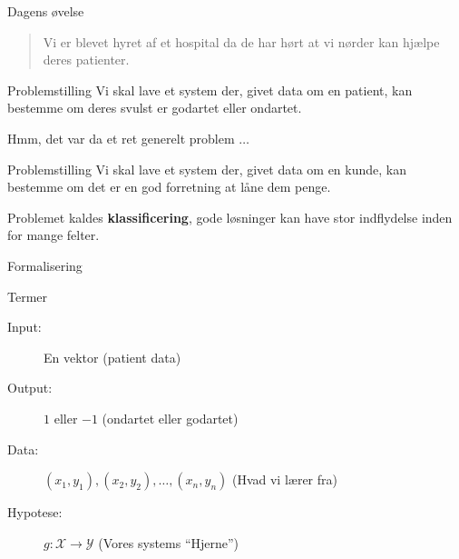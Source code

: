 \documentclass[12pt,t]{beamer}
\begin{document}
    \begin{frame}[t]{Dagens øvelse}
        \begin{quote}
            Vi er blevet hyret af et hospital da de har hørt at vi nørder 
            kan hjælpe deres patienter.
        \end{quote}
        \pause
        \begin{block}{Problemstilling}
            Vi skal lave et system der, givet data om en patient, kan bestemme
            om deres svulst er godartet eller ondartet.
        \end{block}
        \pause
        \centering Hmm, det var da et ret generelt problem $\dots$
        \pause
        \begin{block}{Problemstilling}
            Vi skal lave et system der, givet data om en \alert{kunde},
            kan bestemme om det er en god forretning at låne dem penge.
        \end{block}
        \pause
        \centering Problemet kaldes \textbf{klassificering}, gode løsninger kan
        have stor indflydelse inden for mange felter.
    \end{frame}

    \begin{frame}[c]{Formalisering}
        \begin{block}{Termer}
            \begin{description}
                \item[Input:] En vektor (patient data)  \pause
                \item[Output:] $1$ eller $-1$ (ondartet eller godartet) \pause
                \item[Data:] $(x_1,y_1), (x_2,y_2),\dots,(x_n,y_n)$
                (Hvad vi lærer fra) \pause
                \item[Hypotese:] $g: \mathcal{X} \rightarrow
                                   \mathcal{Y}$ (Vores systems ``Hjerne'')
            \end{description}
        \end{block}
    \end{frame}
\end{document}
